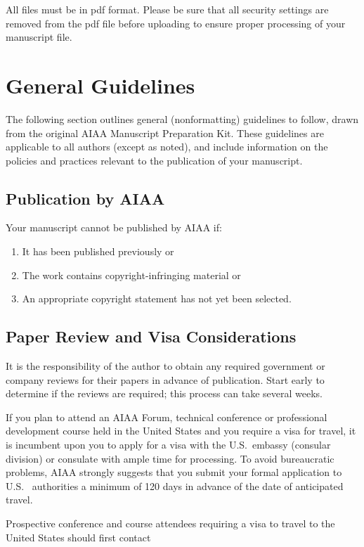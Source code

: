 All files must be in pdf format. Please be sure that all security settings are removed from the pdf file before uploading to ensure proper processing of your manuscript file.

\section{General Guidelines}

The following section outlines general (nonformatting) guidelines to follow, drawn from the original AIAA Manuscript Preparation Kit. These guidelines are applicable to all authors (except as noted), and include information on the policies and practices relevant to the publication of your manuscript.

\subsection{Publication by AIAA}
Your manuscript cannot be published by AIAA if:
\begin{enumerate}
\item It has been published previously or

\item The work contains copyright-infringing material or

\item An appropriate copyright statement has not yet been selected.
\end{enumerate}

\subsection{Paper Review and Visa Considerations}

It is the responsibility of the author to obtain any required government or company reviews for their papers in advance of publication. Start early to determine if the reviews are required; this process can take several weeks.

If you plan to attend an AIAA Forum, technical conference or professional development course held in the United States and you require a visa for travel, it is incumbent upon you to apply for a visa with the U.S.~embassy (consular division) or consulate with ample time for processing.  To avoid bureaucratic problems, AIAA strongly suggests that you submit your formal application to U.S.~ authorities a minimum of 120 days in advance of the date of anticipated travel.

Prospective conference and course attendees requiring a visa to travel to the United States should first contact

